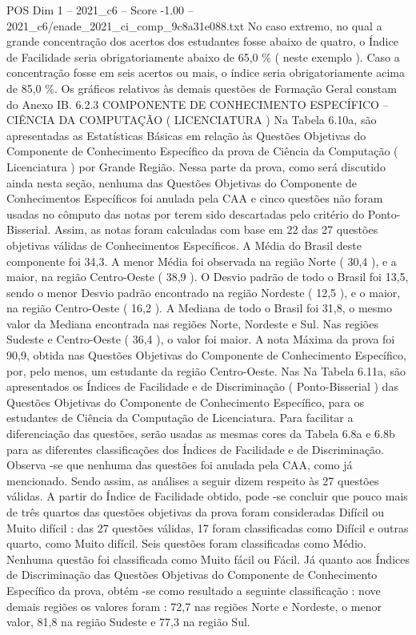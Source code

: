 \begin{textsample}{POS Dim 1 – 2021\_c6 – Score -1.00 – 2021\_c6/enade\_2021\_ci\_comp\_9c8a31e088.txt}
No caso extremo, no qual a grande concentração dos acertos dos estudantes fosse abaixo de quatro, o Índice de Facilidade seria obrigatoriamente abaixo de 65,0 \% ( neste exemplo ).
Caso a concentração fosse em seis acertos ou mais, o índice seria obrigatoriamente acima de 85,0 \%.
Os gráficos relativos às demais questões de Formação Geral constam do Anexo IB. 6.2.3 COMPONENTE DE CONHECIMENTO ESPECÍFICO – CIÊNCIA DA COMPUTAÇÃO ( LICENCIATURA ) Na Tabela 6.10a, são apresentadas as Estatísticas Básicas em relação às Questões Objetivas do Componente de Conhecimento Específico da prova de Ciência da Computação ( Licenciatura ) por Grande Região.
Nessa parte da prova, como será discutido ainda nesta seção, nenhuma das Questões Objetivas do Componente de Conhecimentos Específicos foi anulada pela CAA e cinco questões não foram usadas no cômputo das notas por terem sido descartadas pelo critério do Ponto-Bisserial.
Assim, as notas foram calculadas com base em 22 das 27 questões objetivas válidas de Conhecimentos Específicos.
A Média do Brasil deste componente foi 34,3.
A menor Média foi observada na região Norte ( 30,4 ), e a maior, na região Centro-Oeste ( 38,9 ).
O Desvio padrão de todo o Brasil foi 13,5, sendo o menor Desvio padrão encontrado na região Nordeste ( 12,5 ), e o maior, na região Centro-Oeste ( 16,2 ).
A Mediana de todo o Brasil foi 31,8, o mesmo valor da Mediana encontrada nas regiões Norte, Nordeste e Sul.
Nas regiões Sudeste e Centro-Oeste ( 36,4 ), o valor foi maior.
A nota Máxima da prova foi 90,9, obtida nas Questões Objetivas do Componente de Conhecimento Específico, por, pelo menos, um estudante da região Centro-Oeste.
Nas Na Tabela 6.11a, são apresentados os Índices de Facilidade e de Discriminação ( Ponto-Bisserial ) das Questões Objetivas do Componente de Conhecimento Específico, para os estudantes de Ciência da Computação de Licenciatura.
Para facilitar a diferenciação das questões, serão usadas as mesmas cores da Tabela 6.8a e 6.8b para as diferentes classificações dos Índices de Facilidade e de Discriminação.
Observa -se que nenhuma das questões foi anulada pela CAA, como já mencionado.
Sendo assim, as análises a seguir dizem respeito às 27 questões válidas.
A partir do Índice de Facilidade obtido, pode -se concluir que pouco mais de três quartos das questões objetivas da prova foram consideradas Difícil ou Muito difícil : das 27 questões válidas, 17 foram classificadas como Difícil e outras quarto, como Muito difícil.
Seis questões foram classificadas como Médio.
Nenhuma questão foi classificada como Muito fácil ou Fácil.
Já quanto aos Índices de Discriminação das Questões Objetivas do Componente de Conhecimento Específico da prova, obtém -se como resultado a seguinte classificação : nove demais regiões os valores foram : 72,7 nas regiões Norte e Nordeste, o menor valor, 81,8 na região Sudeste e 77,3 na região Sul.

\end{textsample}
